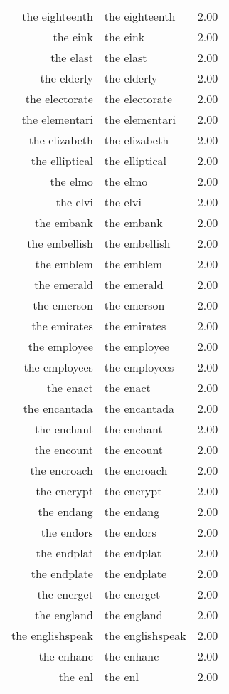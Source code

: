 \begin{table}[ht]
\begin{tabular}{rlr}
  the eighteenth & the eighteenth & 2.00 \\ 
  the eink & the eink & 2.00 \\ 
  the elast & the elast & 2.00 \\ 
  the elderly & the elderly & 2.00 \\ 
  the electorate & the electorate & 2.00 \\ 
  the elementari & the elementari & 2.00 \\ 
  the elizabeth & the elizabeth & 2.00 \\ 
  the elliptical & the elliptical & 2.00 \\ 
  the elmo & the elmo & 2.00 \\ 
  the elvi & the elvi & 2.00 \\ 
  the embank & the embank & 2.00 \\ 
  the embellish & the embellish & 2.00 \\ 
  the emblem & the emblem & 2.00 \\ 
  the emerald & the emerald & 2.00 \\ 
  the emerson & the emerson & 2.00 \\ 
  the emirates & the emirates & 2.00 \\ 
  the employee & the employee & 2.00 \\ 
  the employees & the employees & 2.00 \\ 
  the enact & the enact & 2.00 \\ 
  the encantada & the encantada & 2.00 \\ 
  the enchant & the enchant & 2.00 \\ 
  the encount & the encount & 2.00 \\ 
  the encroach & the encroach & 2.00 \\ 
  the encrypt & the encrypt & 2.00 \\ 
  the endang & the endang & 2.00 \\ 
  the endors & the endors & 2.00 \\ 
  the endplat & the endplat & 2.00 \\ 
  the endplate & the endplate & 2.00 \\ 
  the energet & the energet & 2.00 \\ 
  the england & the england & 2.00 \\ 
  the englishspeak & the englishspeak & 2.00 \\ 
  the enhanc & the enhanc & 2.00 \\ 
  the enl & the enl & 2.00 \\ 

\end{tabular}
\end{table}
